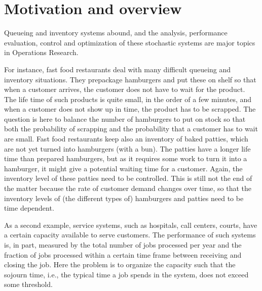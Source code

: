 \documentclass[stochastic-or.tex]{subfiles}
\begin{document}
\section{Motivation and overview}
\label{sec:motivation-overview}

Queueing and inventory systems abound, and the analysis, performance evaluation, control and optimization of these stochastic systems are  major topics in Operations Research.


For instance, fast food restaurants deal with many difficult queueing and inventory situations.
They prepackage hamburgers and put these on shelf
so that when a customer arrives, the customer does not have to wait for the product.
The life time of such products is quite small, in the order of a few minutes, and when a customer does not show up in time, the product has to be scrapped.
The question is here to balance the number of hamburgers to put on stock so that both the probability of scrapping and the probability that a customer has to wait
are small.
Fast food restaurants keep also an inventory of baked patties, which are not yet turned into hamburgers (with a bun).
The patties have a longer life time than prepared hamburgers, but as it requires some work to turn it into a hamburger, it might give a potential waiting time for a customer.
Again, the inventory level of these patties need to be controlled.
This is still not the end of the matter because the rate of customer demand changes over time, so that the inventory levels of (the different types of) hamburgers and patties need to be time dependent.

As a second example, service systems, such as hospitals, call centers, courts, have a certain capacity available to serve customers.
The performance of such systems is, in part, measured by the total number of jobs processed per year and the fraction of jobs processed within a certain time frame between receiving and closing the job.
Here the problem is to organize the capacity such that the sojourn time, i.e., the typical time a job spends in the system, does not exceed some threshold.
\end{document}
